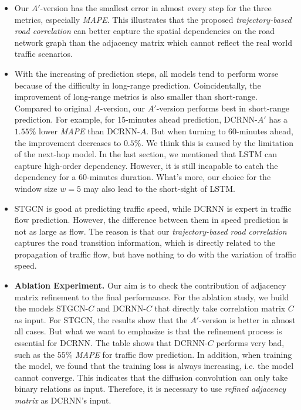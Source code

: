 \begin{itemize}
    \item Our $A'$-version has the smallest error in almost every step for the three metrics, especially \textit{MAPE}. This illustrates that the proposed \textit{trajectory-based road correlation} can better capture the spatial dependencies on the road network graph than the adjacency matrix which cannot reflect the real world traffic scenarios.
    \item With the increasing of prediction steps, all models tend to perform worse because of the difficulty in long-range prediction. Coincidentally, the improvement of long-range metrics is also smaller than short-range. Compared to original $A$-version, our $A'$-version performs best in short-range prediction. For example, for 15-minutes ahead prediction, DCRNN-$A'$ has a $1.55\%$ lower \textit{MAPE} than DCRNN-$A$. But when turning to 60-minutes ahead, the improvement decreases to $0.5\%$. We think this is caused by the limitation of the next-hop model. In the last section, we mentioned that LSTM can capture high-order dependency. However, it is still incapable to catch the dependency for a 60-minutes duration. What's more, our choice for the window size $w=5$ may also lead to the short-sight of LSTM.
    \item STGCN is good at predicting traffic speed, while DCRNN is expert in traffic flow prediction. However, the difference between them in speed prediction is not as large as flow. The reason is that our \textit{trajectory-based road correlation} captures the road transition information, which is directly related to the propagation of traffic flow, but have nothing to do with the variation of traffic speed.
    \item \textbf{Ablation Experiment.} Our aim is to check the contribution of adjacency matrix refinement to the final performance. For the ablation study, we build the models STGCN-$C$ and DCRNN-$C$ that directly take correlation matrix $C$ as input. For STGCN, the results show that the $A'$-version is better in almost all cases. But what we want to emphasize is that the refinement process is essential for DCRNN. The table shows that DCRNN-$C$ performs very bad, such as the $55\%$ \textit{MAPE} for traffic flow prediction. In addition, when training the model, we found that the training loss is always increasing, i.e. the model cannot converge. This indicates that the diffusion convolution can only take binary relations as input. Therefore, it is necessary to use \textit{refined adjacency matrix} as DCRNN's input.
\end{itemize}

